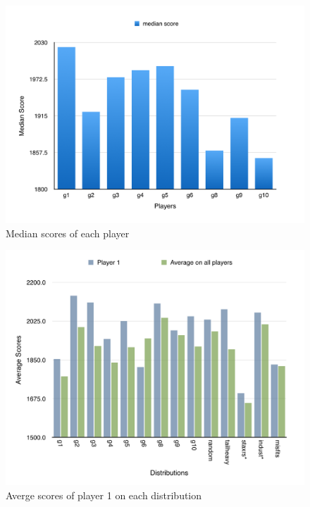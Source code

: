 \documentclass{beamer}
\begin{document}
\begin{frame}
  \begin{figure}[t]
\begin{center}
\includegraphics[width=0.48\linewidth]{median.png}
\end{center}
\caption{Median scores of each player}\label{fig:median}
\end{figure}
\end{frame}

\begin{frame}
\begin{figure}[ht]
\begin{center}
\includegraphics[width=0.48\linewidth]{average.png}
\end{center}
\caption{Averge scores of player 1 on each distribution}\label{fig:average}
\end{figure}
\end{frame}
\end{document}
